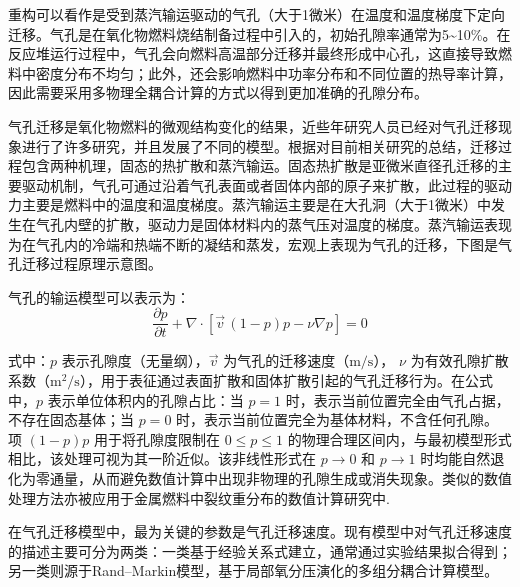 重构可以看作是受到蒸汽输运驱动的气孔（大于1微米）在温度和温度梯度下定向迁移。气孔是在氧化物燃料烧结制备过程中引入的，初始孔隙率通常为5\~{}10\%。在反应堆运行过程中，气孔会向燃料高温部分迁移并最终形成中心孔，这直接导致燃料中密度分布不均匀；此外，还会影响燃料中功率分布和不同位置的热导率计算，因此需要采用多物理全耦合计算的方式以得到更加准确的孔隙分布。

气孔迁移是氧化物燃料的微观结构变化的结果，近些年研究人员已经对气孔迁移现象进行了许多研究，并且发展了不同的模型。根据对目前相关研究的总结\cite{kanekoCalculationProgramMIVOID1969,vanceComputerSimulationPore2017,sensKineticsPoreMovement1972,ronchiPropertiesLenticularPores1974,novasconeModelingPorosityMigration2018,wellandMatterTransportFast2020}，迁移过程包含两种机理，固态的热扩散和蒸汽输运。固态热扩散是亚微米直径孔迁移的主要驱动机制，气孔可通过沿着气孔表面或者固体内部的原子来扩散，此过程的驱动力主要是燃料中的温度和温度梯度。蒸汽输运\cite{sensKineticsPoreMovement1972}主要是在大孔洞（大于1微米）中发生在气孔内壁的扩散，驱动力是固体材料内的蒸气压对温度的梯度。蒸汽输运表现为在气孔内的冷端和热端不断的凝结和蒸发，宏观上表现为气孔的迁移，下图是气孔迁移过程原理示意图。

气孔的输运模型\cite{sensKineticsPoreMovement1972,novasconeModelingPorosityMigration2018}可以表示为：
\begin{equation}
	\frac{\partial p}{\partial t}
	+ \nabla \cdot \left[ \vec{v}\,(1-p)p - \nu \nabla p \right] = 0
	\label{eq:pore_transport}
\end{equation}

式中：$p$ 表示孔隙度（无量纲），$\vec{v}$ 为气孔的迁移速度（$\mathrm{m/s}$），
$\nu$ 为有效孔隙扩散系数（$\mathrm{m^2/s}$），用于表征通过表面扩散和固体扩散引起的气孔迁移行为。在公式中，$p$ 表示单位体积内的孔隙占比：当 $p=1$ 时，表示当前位置完全由气孔占据，不存在固态基体；当 $p=0$ 时，表示当前位置完全为基体材料，不含任何孔隙。项 $(1-p)p$ 用于将孔隙度限制在 $0 \leq p \leq 1$ 的物理合理区间内，与最初模型形式相比，该处理可视为其一阶近似。该非线性形式在 $p \to 0$ 和 $p \to 1$ 时均能自然退化为零通量，从而避免数值计算中出现非物理的孔隙生成或消失现象。类似的数值处理方法亦被应用于金属燃料中裂纹重分布的数值计算研究中\cite{gallowayModelingConstituentRedistribution2015}.

在气孔迁移模型中，最为关键的参数是气孔迁移速度。现有模型中对气孔迁移速度的描述主要可分为两类：一类基于经验关系式建立，通常通过实验结果拟合得到\cite{ronchiPropertiesLenticularPores1974,sensKineticsPoreMovement1972,nicholsTheoryColumnarGrain1967}；另一类则源于Rand--Markin模型\cite{olanderFundamentalAspectsNuclear1976}，基于局部氧分压演化的多组分耦合计算模型\cite{ikusawaDevelopmentVerificationThermal2014}。

